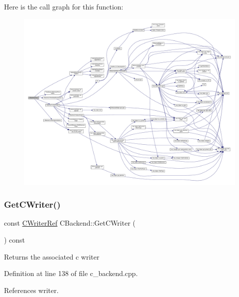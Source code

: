 Here is the call graph for this function\+:
\nopagebreak
\begin{figure}[H]
\begin{center}
\leavevmode
\includegraphics[width=350pt]{d3/de2/classCBackend_ab35c39606dc2d39998ccd35edf7c82df_cgraph}
\end{center}
\end{figure}
\mbox{\label{classCBackend_a38b67519696c9c3cc4c395fcf16b973d}} 
\subsubsection{\texorpdfstring{Get\+C\+Writer()}{GetCWriter()}}
{\footnotesize\ttfamily const \hyperlink{c__writer_8hpp_a4e9c4dfe17e35f981e27b6dd97f9632c}{C\+Writer\+Ref} C\+Backend\+::\+Get\+C\+Writer (\begin{DoxyParamCaption}{ }\end{DoxyParamCaption}) const}

\begin{DoxyReturn}{Returns}
the associated c writer 
\end{DoxyReturn}


Definition at line 138 of file c\+\_\+backend.\+cpp.



References writer.

\mbox{\label{classCBackend_af879cc47d9bc18eb778390825b85667d}} 
